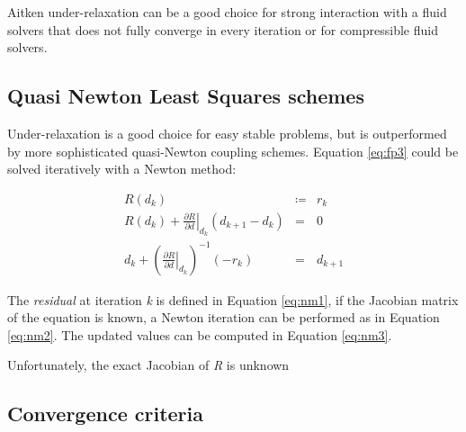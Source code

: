 Aitken under-relaxation can be a good choice for strong interaction with a fluid solvers that does not fully converge in every iteration or for compressible fluid solvers.


\subsection{Quasi Newton Least Squares schemes}

Under-relaxation is a good choice for easy stable problems, but is outperformed by more sophisticated quasi-Newton coupling schemes. Equation \ref{eq:fp3} could be solved iteratively with a Newton method:

\begin{subequations}
	\begin{eqnarray}
		\label{eq:nm1}
		R(d_k) &\coloneqq&  r_k  \\
		\label{eq:nm2}
		R(d_k) + \left. \frac{\partial R}{\partial d}\right|_{d_k} \left( d_{k+1} - d_k \right) &=& 0 \\
		\label{eq:nm3}
		d_k + \left(  \left. \frac{\partial R}{\partial d} \right|_{d_k} \right)^{-1} \left(-r_k \right) &=&  d_{k+1}
	\end{eqnarray} 
	\label{eq:fp-equations}
\end{subequations}

The \textit{residual} at iteration \textit{k} is defined in Equation \ref{eq:nm1}, if the Jacobian matrix of the equation is known, a Newton iteration can be performed as in Equation \ref{eq:nm2}. The updated values can be computed in Equation \ref{eq:nm3}.

Unfortunately, the exact Jacobian of \textit{R} is unknown 



\subsection{Convergence criteria}






















